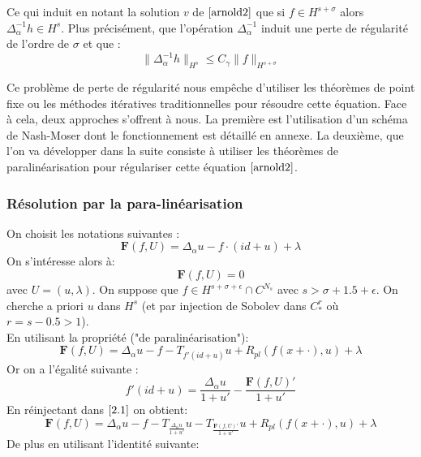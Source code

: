 \documentclass[11pt,a4paper]{article}
\begin{document}
Ce qui induit en notant la solution $v$ de $\ref{arnold2}$ que si $f \in H^{s+\sigma}$ alors $\Delta_\alpha^{-1}h \in H^{s}$. Plus précisément, que l'opération $\Delta_{\alpha}^{-1}$ induit une perte de régularité de l'ordre de $\sigma$ et que :
\begin{equation}\label{dio}
\|\Delta_\alpha^{-1}h\|_{H^s} \leq C_\gamma \|f\|_{H^{s+\sigma}}
\end{equation}
\par
Ce problème de perte de régularité nous empêche d'utiliser les théorèmes de point fixe ou les méthodes itératives traditionnelles pour résoudre cette équation. Face à cela, deux approches s'offrent à nous. La première est l'utilisation d'un schéma de Nash-Moser dont le fonctionnement est détaillé en annexe. La deuxième, que l'on va développer dans la suite consiste à utiliser les théorèmes de paralinéarisation pour régulariser cette équation $\eqref{arnold2}$.
\subsubsection{Résolution par la para-linéarisation}
On choisit les notations suivantes :
\begin{equation*}
\mathbf{F}(f,U)=\Delta_\alpha u - f \cdot (id +u) + \lambda
\end{equation*}
On s'intéresse alors à:
\begin{equation}\label{equ_reso}
\mathbf{F}(f,U)=0
\end{equation}
avec $U=(u,\lambda)$. On suppose que $f \in H^{s+\sigma+ \epsilon} \cap C^{N_s}$ avec $s>\sigma +1.5+ \epsilon$. On cherche a priori $u$ dans $H^s$ (et par injection de Sobolev dans $C^r_*$ où $r=s-0.5>1$).\\
En utilisant la propriété ("de paralinéarisation"):
\begin{equation}\label{2.1}
\mathbf{F}(f,U)=\Delta_\alpha u -f-T_{f'(id +u)}u +R_{pl}(f(x+\cdot),u) + \lambda
\end{equation}
Or on a l'égalité suivante :
\begin{equation*}
f'(id+u)=\frac{\Delta_\alpha u}{1+u'} -\frac{\mathbf{F}(f,U)'}{1+u'}
\end{equation*}
En réinjectant dans $\ref{2.1}$ on obtient:
\begin{equation}\label{2.2}
\mathbf{F}(f,U)=\Delta_\alpha u -f-T_{\frac{\Delta_\alpha u}{1+u'}}u -T_{\frac{\mathbf{F}(f,U)'}{1+u'}}u +R_{pl}(f(x+\cdot),u) + \lambda
\end{equation}
De plus en utilisant l'identité suivante:
\end{document}
